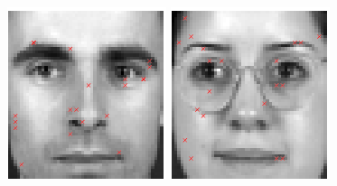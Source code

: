 \begin{figure}[ht]
\begin{center}
\includegraphics[width=\textwidth/9]{ch4/figures/NoC5.png}
\includegraphics[width=\textwidth/9]{ch4/figures/NoC6.png}

\end{center}
\end{figure}
